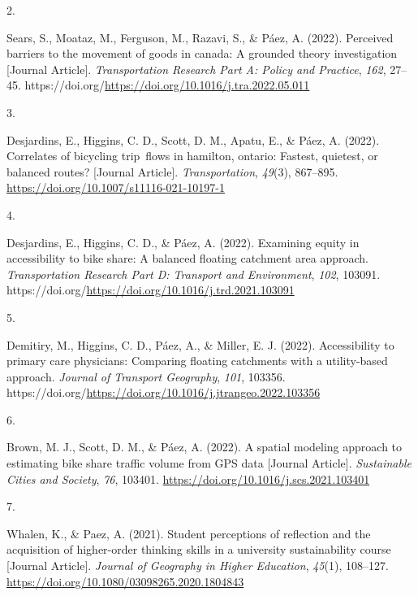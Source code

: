 \documentclass[10pt,a4paper,]{twentysecondcv}
\newlength{\csllabelwidth}
\newcommand{\CSLLeftMargin}[1]{\parbox[t]{\csllabelwidth}{#1}}
\newcommand{\CSLRightInline}[1]{\parbox[t]{\linewidth - \csllabelwidth}{#1}}
\begin{document}
\leavevmode{}%
\CSLLeftMargin{2. }%
\CSLRightInline{Sears, S., Moataz, M., Ferguson, M., Razavi, S., \&
Páez, A. (2022). Perceived barriers to the movement of goods in canada:
A grounded theory investigation {[}Journal Article{]}.
\emph{Transportation Research Part A: Policy and Practice}, \emph{162},
27--45. https://doi.org/\url{https://doi.org/10.1016/j.tra.2022.05.011}}

\leavevmode{}%
\CSLLeftMargin{3. }%
\CSLRightInline{Desjardins, E., Higgins, C. D., Scott, D. M., Apatu, E.,
\& Páez, A. (2022). Correlates of bicycling trip~flows in hamilton,
ontario: Fastest, quietest, or balanced routes? {[}Journal Article{]}.
\emph{Transportation}, \emph{49}(3), 867--895.
\url{https://doi.org/10.1007/s11116-021-10197-1}}

\leavevmode{}%
\CSLLeftMargin{4. }%
\CSLRightInline{Desjardins, E., Higgins, C. D., \& Páez, A. (2022).
Examining equity in accessibility to bike share: A balanced floating
catchment area approach. \emph{Transportation Research Part D: Transport
and Environment}, \emph{102}, 103091.
https://doi.org/\url{https://doi.org/10.1016/j.trd.2021.103091}}

\leavevmode{}%
\CSLLeftMargin{5. }%
\CSLRightInline{Demitiry, M., Higgins, C. D., Páez, A., \& Miller, E. J.
(2022). Accessibility to primary care physicians: Comparing floating
catchments with a utility-based approach. \emph{Journal of Transport
Geography}, \emph{101}, 103356.
https://doi.org/\url{https://doi.org/10.1016/j.jtrangeo.2022.103356}}

\leavevmode{}%
\CSLLeftMargin{6. }%
\CSLRightInline{Brown, M. J., Scott, D. M., \& Páez, A. (2022). A
spatial modeling approach to estimating bike share traffic volume from
GPS data {[}Journal Article{]}. \emph{Sustainable Cities and Society},
\emph{76}, 103401. \url{https://doi.org/10.1016/j.scs.2021.103401}}

\leavevmode{}%
\CSLLeftMargin{7. }%
\CSLRightInline{Whalen, K., \& Paez, A. (2021). Student perceptions of
reflection and the acquisition of higher-order thinking skills in a
university sustainability course {[}Journal Article{]}. \emph{Journal of
Geography in Higher Education}, \emph{45}(1), 108--127.
\url{https://doi.org/10.1080/03098265.2020.1804843}}
\end{document}
